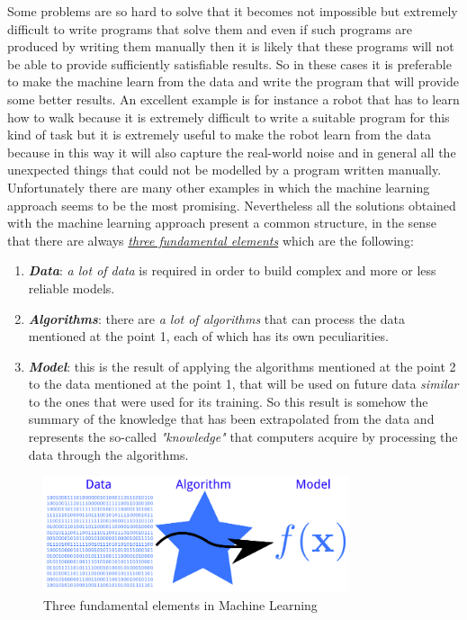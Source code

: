 \newpage

Some problems are so hard to solve that it becomes not impossible but extremely difficult to write programs that solve them and even if such programs are produced by writing them manually then it is likely that these programs will not be able to provide sufficiently satisfiable results. So in these cases it is preferable to make the machine learn from the data and write the program that will provide some better results. An excellent example is for instance a robot that has to learn how to walk because it is extremely difficult to write a suitable program for this kind of task but it is extremely useful to make the robot learn from the data because in this way it will also capture the real-world noise and in general all the unexpected things that could not be modelled by a program written manually. Unfortunately there are many other examples in which the machine learning approach seems to be the most promising. Nevertheless all the solutions obtained with the machine learning approach present a common structure, in the sense that there are always \underline{\emph{three fundamental elements}} which are the following:

\begin{enumerate}
    \item \emph{\textbf{Data}}: \emph{a lot of data} is required in order to build complex and more or less reliable models.
    \item \emph{\textbf{Algorithms}}: there are \emph{a lot of algorithms} that can process the data mentioned at the point 1, each of which has its own peculiarities.
    \item \emph{\textbf{Model}}: this is the result of applying the algorithms mentioned at the point 2 to the data mentioned at the point 1, that will be used on future data \emph{similar} to the ones that were used for its training. So this result is somehow the summary of the knowledge that has been extrapolated from the data and represents the so-called \emph{"knowledge"} that computers acquire by processing the data through the algorithms.
\end{enumerate}

\vspace{5mm}

\begin{figure}[h]
    \centering
    \includegraphics[width=0.8\textwidth]{../img/Data_algorithm_model}
    \caption{Three fundamental elements in Machine Learning}
\end{figure}

